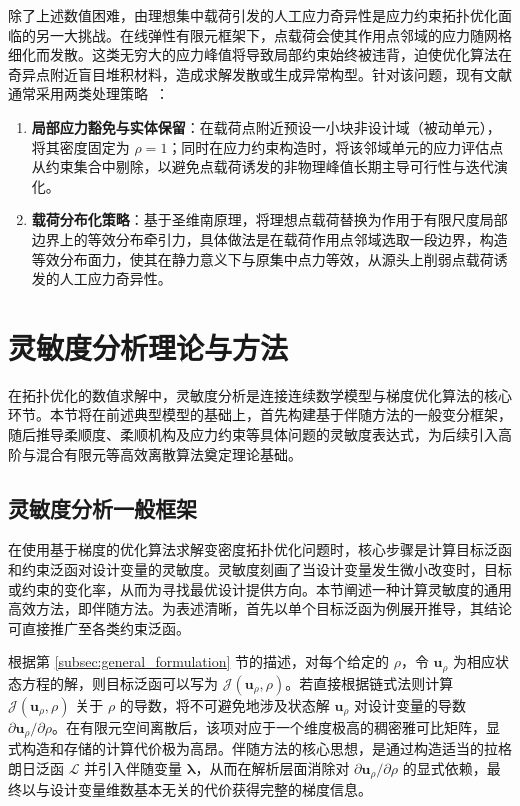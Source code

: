 除了上述数值困难，由理想集中载荷引发的人工应力奇异性是应力约束拓扑优化面临的另一大挑战。在线弹性有限元框架下，点载荷会使其作用点邻域的应力随网格细化而发散。这类无穷大的应力峰值将导致局部约束始终被违背，迫使优化算法在奇异点附近盲目堆积材料，造成求解发散或生成异常构型。针对该问题，现有文献通常采用两类处理策略~\cite{holmbergStressConstrainedTopology2013a, giraldo-londonoPolyStressMatlabImplementation2021}：
\begin{enumerate}[
	label={（\arabic*）},
	labelsep=0.25em,
	leftmargin=3.2em,
	itemsep=0.4em,
	topsep=0.4em,
	parsep=0pt,
	partopsep=0pt
	]
	\item \textbf{局部应力豁免与实体保留}：在载荷点附近预设一小块非设计域（被动单元），将其密度固定为 $\rho=1$；同时在应力约束构造时，将该邻域单元的应力评估点从约束集合中剔除，以避免点载荷诱发的非物理峰值长期主导可行性与迭代演化。
	
	\item \textbf{载荷分布化策略}：基于圣维南原理，将理想点载荷替换为作用于有限尺度局部边界上的等效分布牵引力，具体做法是在载荷作用点邻域选取一段边界，构造等效分布面力，使其在静力意义下与原集中点力等效，从源头上削弱点载荷诱发的人工应力奇异性。
\end{enumerate}


\section{灵敏度分析理论与方法}
\label{sec:sensitivity_analysis}

在拓扑优化的数值求解中，灵敏度分析是连接连续数学模型与梯度优化算法的核心环节。本节将在前述典型模型的基础上，首先构建基于伴随方法的一般变分框架，随后推导柔顺度、柔顺机构及应力约束等具体问题的灵敏度表达式，为后续引入高阶与混合有限元等高效离散算法奠定理论基础。


\subsection{灵敏度分析一般框架}
\label{subsec:sensitivity_framework}

在使用基于梯度的优化算法求解变密度拓扑优化问题时，核心步骤是计算目标泛函和约束泛函对设计变量的灵敏度。灵敏度刻画了当设计变量发生微小改变时，目标或约束的变化率，从而为寻找最优设计提供方向。本节阐述一种计算灵敏度的通用高效方法，即伴随方法。为表述清晰，首先以单个目标泛函为例展开推导，其结论可直接推广至各类约束泛函。

根据第 \ref{subsec:general_formulation} 节的描述，对每个给定的 $\rho$，令 $\boldsymbol{u}_\rho$ 为相应状态方程的解，则目标泛函可以写为 $\mathcal{J}(\boldsymbol{u}_\rho, \rho)$。若直接根据链式法则计算 $\mathcal{J}(\boldsymbol{u}_\rho, \rho)$ 关于 $\rho$ 的导数，将不可避免地涉及状态解 $\boldsymbol{u}_\rho$ 对设计变量的导数 $\partial\boldsymbol{u}_\rho/\partial\rho$。在有限元空间离散后，该项对应于一个维度极高的稠密雅可比矩阵，显式构造和存储的计算代价极为高昂。伴随方法的核心思想，是通过构造适当的拉格朗日泛函 $\mathcal{L}$ 并引入伴随变量 $\boldsymbol{\lambda}$，从而在解析层面消除对 $\partial\boldsymbol{u}_\rho/\partial\rho$ 的显式依赖，最终以与设计变量维数基本无关的代价获得完整的梯度信息。

